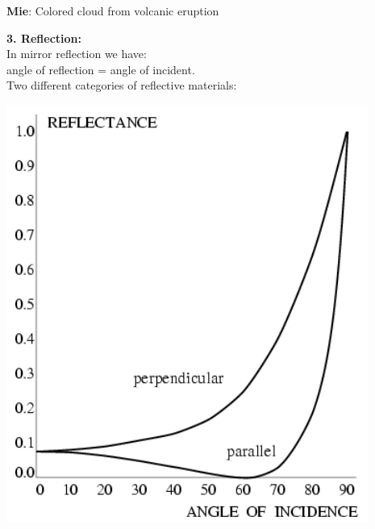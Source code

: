 \documentclass[a4paper, fontsize=8pt, landscape, DIV=1]{scrartcl}
\begin{document}
\begin{multicols*}{4}
\begin{minipage}[t]{0.49\columnwidth}
\begin{flushleft}
 			\end{flushleft}
 		\end{minipage}
 		\begin{minipage}[b]{0.49\columnwidth}
 			\begin{flushleft}
 				\textbf{Mie}: Colored cloud from volcanic eruption
 				\vspace{0.6cm}
 			\end{flushleft}
 		\end{minipage}
		\par 
		\textbf{3. Reflection:}\\
		In mirror reflection we have:\\ angle of reflection = angle of incident.\\
		Two different categories of reflective materials:\\
		\begin{minipage}[t]{0.49\columnwidth}
			\begin{flushleft}
				\includegraphics[width=\columnwidth]{images/Introduction/refl_diel.png}\\
			\end{flushleft}
		\end{minipage}

\end{multicols*}
\end{document}

